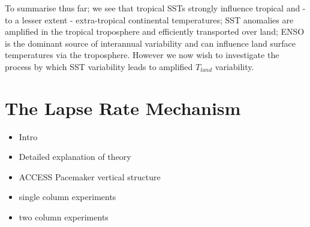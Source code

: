 To summarise thus far; we see that tropical SSTs strongly influence tropical and 
- to a lesser extent - extra-tropical continental temperatures; SST anomalies 
are amplified in the tropical troposphere and efficiently transported over land; 
ENSO is the dominant source of interannual variability and can influence land 
surface temperatures via the troposphere. However we now wish to investigate the 
process by which SST variability leads to amplified $T_{land}$ variability.  



\clearpage

\section{The Lapse Rate Mechanism}

\begin{itemize}
	\item Intro
	\item Detailed explanation of theory
	\item ACCESS Pacemaker vertical structure
	\item single column experiments
	\item two column experiments
\end{itemize}

